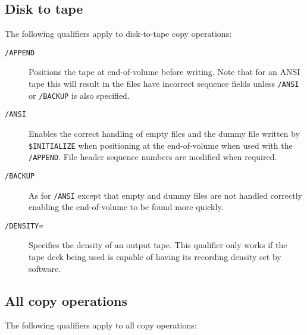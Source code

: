 \subsection{Disk to tape}

The following qualifiers apply to disk-to-tape copy operations:

\begin{description}
\item[\tt/APPEND] Positions the tape at end-of-volume before
writing. Note that for an ANSI tape this will result in the files have
incorrect sequence fields unless {\tt/ANSI} or {\tt/BACKUP} is also specified.

\item[\tt/ANSI] Enables the correct handling of empty files and the dummy file
written by {\tt \$INITIALIZE} when positioning at the end-of-volume when used
with the {\tt/APPEND}. File header sequence numbers are modified when required.

\item[\tt/BACKUP] As for {\tt/ANSI} except that empty and dummy files are not
handled correctly enabling the end-of-volume to be found more quickly.

\item[\tt/DENSITY=] Specifies the density of an output tape. This qualifier
only works if the tape deck being used is capable of having its recording
density set by software.
\end{description}

\subsection{All copy operations}

The following qualifiers apply to all copy operations:

